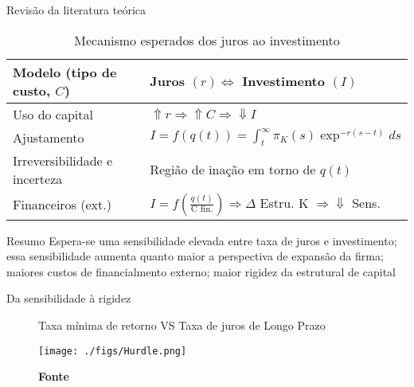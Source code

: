 \documentclass[presentation]{beamer}
\begin{document}
\begin{frame}[label={sec:org202792a}]{Revisão da literatura teórica}
\begin{table}[htbp]
\caption{Mecanismo esperados dos juros ao investimento}
\centering
\begin{tabular}{ll}
\hline
Modelo (tipo de custo, \(C\)) & Juros \((r) \Leftrightarrow\) Investimento \((I)\)\\
\hline
Uso do capital & \(\Uparrow r \Rightarrow \Uparrow C \Rightarrow \Downarrow I\)\\
Ajustamento & \(I = f(q(t)) = \int_{t}^{{\infty}} \pi_{K}(s)\exp^{-r(s-t)}ds\)\\
Irreversibilidade e incerteza & Região de inação em torno de \(q(t)\)\\
Financeiros (ext.) & \(I = f\left(\frac{q(t)}{\text{C fin.}}\right) \Rightarrow \Delta\) Estru. K \(\Rightarrow \Downarrow\) Sens.\\
\hline
\end{tabular}
\end{table}

\begin{block}{Resumo}
Espera-se uma sensibilidade elevada entre taxa de juros e investimento; essa sensibilidade aumenta quanto maior a perspectiva de expansão da firma; maiores custos de financialmento externo; maior rigidez da estrutural de capital
\end{block}
\end{frame}
\begin{frame}[label={sec:org7d9ba03}]{Da sensibilidade à rigidez}
\begin{figure}[htb]
\centering
\caption{Taxa mínima de retorno VS Taxa de juros de Longo Prazo} 
\texttt{[image: ./figs/Hurdle.png]}
\label{fig:cycles}
\caption*{\textbf{Fonte} \textcite[p.~6]{sharpe_2020_Why}}
\end{figure}
\end{frame}
\end{document}
